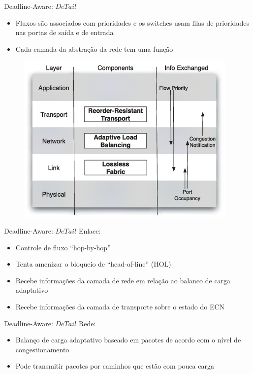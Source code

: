 \documentclass[aspectratio=169]{beamer}
\begin{document}
	\begin{frame} {Deadline-Aware: $DeTail$}
		\begin{itemize}
		 	\item
		 		Fluxos são associados com prioridades e os switches usam filas de prioridades nas portas de saída e de entrada
		 	\item
				Cada camada da abstração da rede tem uma função
		 \end{itemize}

		\begin{figure}[ht]   
			\includegraphics[scale=0.5]{imagens/detail.png}
			\label{fig:sample_figure}
		\end{figure}
	\end{frame}

	\begin{frame} {Deadline-Aware: $DeTail$}
		Enlace:
		\begin{itemize}
		 	\item
		 		Controle de fluxo “hop-by-hop” 
		 	\item
				Tenta amenizar o bloqueio de “head-of-line” (HOL)
		 	\item
				Recebe informações da camada de rede em relação ao balanco de carga adaptativo
		 	\item
				Recebe informações da camada de transporte sobre o estado do ECN
		 \end{itemize}
	\end{frame}

	\begin{frame} {Deadline-Aware: $DeTail$}
		Rede:
		\begin{itemize}
		 	\item
		 		Balanço de carga adaptativo baseado em pacotes de acordo com o nível de congestionamento
		 	\item
				Pode transmitir pacotes por caminhos que estão com pouca carga
		 \end{itemize}
	\end{frame}
\end{document}

